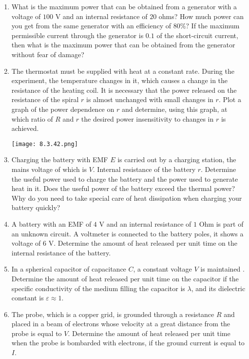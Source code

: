 \documentclass{article}
\begin{document}
\begin{enumerate}[label=8.3.\arabic*]
\item What is the maximum power that can be obtained from a generator with a voltage of $100$ V and an internal resistance of $20$ ohms? How much power can you get from the same generator with an efficiency of $80 \%$? If the maximum permissible current through the generator is $0.1$ of the short-circuit current, then what is the maximum power that can be obtained from the generator without fear of damage?

\item The thermostat must be supplied with heat at a constant rate. During the experiment, the temperature changes in it, which causes a change in the resistance of the heating coil. It is necessary that the power released on the resistance of the spiral $r$ is almost unchanged with small changes in $r$. Plot a graph of the power dependence on $r$ and determine, using this graph, at which ratio of $R$ and $r$ the desired power insensitivity to changes in $r$ is achieved.

\begin{center}
    \texttt{[image: 8.3.42.png]}
\end{center}


\item Charging the battery with EMF $E$ is carried out by a charging station, the mains voltage of which is $V$. Internal resistance of the battery $r$. Determine the useful power used to charge the battery and the power used to generate heat in it. Does the useful power of the battery exceed the thermal power? Why do you need to take special care of heat dissipation when charging your battery quickly?

\item A battery with an EMF of $4$ V and an internal resistance of $1$ Ohm is part of an unknown circuit. A voltmeter is connected to the battery poles, it shows a voltage of $6$ V. Determine the amount of heat released per unit time on the internal resistance of the battery.

\item In a spherical capacitor of capacitance $C$, a constant voltage $V$ is maintained . Determine the amount of heat released per unit time on the capacitor if the specific conductivity of the medium filling the capacitor is $\lambda$, and its dielectric constant is $\varepsilon \approx 1$.

\item The probe, which is a copper grid, is grounded through a resistance $R$ and placed in a beam of electrons whose velocity at a great distance from the probe is equal to $V$. Determine the amount of heat released per unit time when the probe is bombarded with electrons, if the ground current is equal to $I$.


\end{enumerate}
\end{document}
